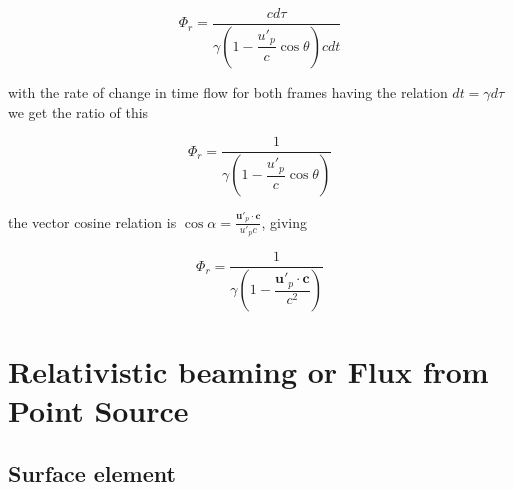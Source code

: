 \begin{equation}
	\Phi_r = \frac{c d\tau}{ \gamma \left(1-\dfrac{u'_p}{c}  \cos\theta \right) c dt}
\end{equation}

with the rate of change in time flow for both frames having the relation $dt=\gamma d\tau$ we get the ratio of this

\begin{equation}
	\Phi_r = \frac{1}{ \gamma \left(1-\dfrac{u'_p}{c}  \cos\theta \right)}
\end{equation}

the vector cosine relation is $\cos\alpha = \frac{\mathbf{u}'_p \cdot \mathbf{c}}{u'_p c}$, giving

\begin{equation}
	\Phi_r = \frac{1}{ \gamma \left(1-\dfrac{\mathbf{u}'_p \cdot \mathbf{c}}{ c^2} \right)}
\end{equation}

\section{Relativistic beaming or Flux from Point Source}

\subsection{Surface element}






